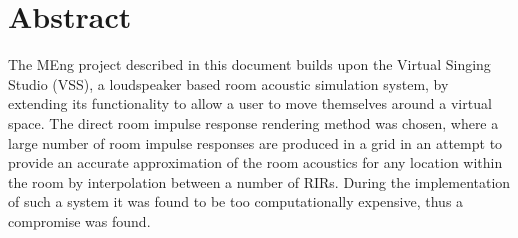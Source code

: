 \documentclass[../../main.tex]{subfiles}
\begin{document}
\clearpage
\thispagestyle{empty}
	
	\section{Abstract}

			 \vspace{5mm}
		 \begin{center}
		 \begin{minipage}{0.6\textwidth}
		 The MEng project described in this document builds upon the Virtual Singing Studio (VSS), a loudspeaker based room acoustic simulation system, by extending its functionality to allow a user to move themselves around a virtual space. The direct room impulse response rendering method was chosen, where a large number of room impulse responses are produced in a grid in an attempt to provide an accurate approximation of the room acoustics for any location within the room by interpolation between a number of RIRs. During the implementation of such a system it was found to be too computationally expensive, thus a compromise was found.
		 \end{minipage}
		 \end{center}
		 \vspace{5mm}
\end{document}
